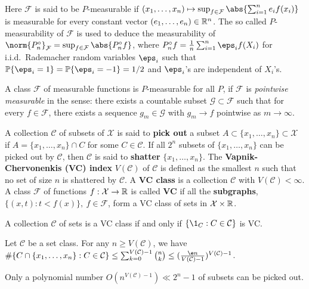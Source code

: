\documentclass[12pt, a3paper, openany]{book}
\begin{document}
Here $\mathcal{F}$ is said to be $P$-measurable if $(x_{1},\dots,x_{n}) \mapsto \sup_{f\in\mathcal{F}} \abs{\sum_{i=1}^{n}e_{i}f(x_{i})}$ is measurable for every constant vector $(e_{1},\dots,e_{n}) \in \mathbb{R}^{n}$. 
The so called $P$-measurability of $\mathcal{F}$ is used to deduce the measurability of $\norm{P_{n}^{\circ}}_{\mathcal{F}} = \sup_{f\in\mathcal{F}} \abs{P_{n}^{\circ}f}$, where 
$ P_{n}^{\circ} f = \frac{1}{n} \sum_{i=1}^{n} \eps_{i} f(X_{i}) $
for i.i.d.\ Rademacher random variables $\eps_{i}$ such that $\P\{ \eps_{i} = 1 \} = \P\{ \eps_{i} = -1 \} = 1/2$ and $\eps_{i}$'s are independent of $X_{i}$'s.

\begin{Lemma}
A class $\mathcal{F}$ of measurable functions is $P$-measurable for all $P$, if $\mathcal{F}$ is \emph{pointwise measurable} in the sense: there exists a countable subset $\mathcal{G} \subset \mathcal{F}$ such that for every $f \in \mathcal{F}$, there exists a sequence $g_{m} \in \mathcal{G}$ with $g_{m} \to f$ pointwise as $m \to \infty$.
\end{Lemma}


A collection $\mathcal{C}$ of subsets of $\mathcal{X}$ is said to \textbf{pick out} a subset $A \subset \{x_{1},\dots,x_{n}\} \subset \mathcal{X}$ if $A = \{x_{1},\dots,x_{n}\} \cap C$ for some $C \in \mathcal{C}$. If all $2^{n}$ subsets of $\{x_{1},\dots,x_{n}\}$ can be picked out by $\mathcal{C}$, then $\mathcal{C}$ is said to \textbf{shatter} $\{x_{1},\dots,x_{n}\}$. The \textbf{Vapnik-Chervonenkis (VC) index} $V(\mathcal{C})$ of $\mathcal{C}$ is defined as the smallest $n$ such that no set of size $n$ is shattered by $\mathcal{C}$. A \textbf{VC class} is a collection $\mathcal{C}$ with $V(\mathcal{C}) < \infty$.
A class $\mathcal{F}$ of functions $f : \mathcal{X} \to \mathbb{R}$ is called \textbf{VC} if all the \textbf{subgraphs}, $\{ (x,t) : t<f(x) \}, \ f \in \mathcal{F}$, form a VC class of sets in $\mathcal{X} \times \mathbb{R}$.
\begin{remark}
A collection $\mathcal{C}$ of sets is a VC class if and only if $\{\1_{C}:C\in\mathcal{C}\}$ is VC.
\end{remark}

\begin{Lemma}
Let $\mathcal{C}$ be a set class. For any $n \geq V(\mathcal{C})$, we have 
$\#\{ C\cap\{x_{1},\dots,x_{n}\} : C\in\mathcal{C} \} \leq \sum_{k=0}^{V(\mathcal{C})-1} \binom{n}{k} \leq (\frac{\e n}{V(\mathcal{C})-1})^{{V(\mathcal{C})-1}}$.
\begin{remark}
Only a polynomial number $O(n^{{V(\mathcal{C})-1}}) \ll 2^{n}-1$ of subsets can be picked out.
\end{remark}
\end{Lemma}
\end{document}
